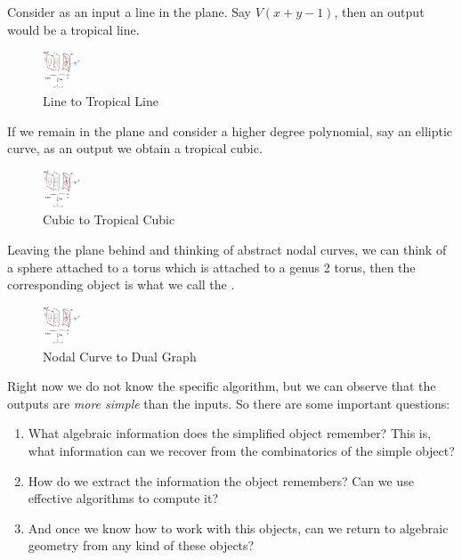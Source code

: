 \documentclass[12pt]{memoir}
\begin{document}
\begin{Ex}
    Consider as an input a line in the plane. Say $V(x+y-1)$, then an output would be a tropical line. 
    \begin{figure}[h!]
        \centering
        \includegraphics[width=0.1\textwidth]{figs/fig1-1.png}%
        \caption{Line to Tropical Line}
        \label{fig:1-1-LineToTropLine}
    \end{figure}
    If we remain in the plane and consider a higher degree polynomial, say an elliptic curve, as an output we obtain a tropical cubic.
    \begin{figure}[h!]
        \centering
        \includegraphics[width=0.1\textwidth]{figs/fig1-1.png}%
        \caption{Cubic to Tropical Cubic}
        \label{fig:1-2-CubicToTropCubic}
    \end{figure}
    Leaving the plane behind and thinking of abstract nodal curves, we can think of a sphere attached to a torus which is attached to a genus 2 torus, then the corresponding object is what we call the .
    \begin{figure}[h!]
        \centering
        \includegraphics[width=0.1\textwidth]{figs/fig1-1.png}%
        \caption{Nodal Curve to Dual Graph}
        \label{fig:1-3-NodalToGraph}
    \end{figure}
\end{Ex}

Right now we do not know the specific algorithm, but we can observe that the outputs are \emph{more simple} than the inputs. So there are some important questions:

\begin{enumerate}
    \item What algebraic information does the simplified object remember? This is, what information can we recover from the combinatorics of the simple object?
    \item How do we extract the information the object remembers? Can we use effective algorithms to compute it?
    \item And once we know how to work with this objects, can we return to algebraic geometry from any kind of these objects?
\end{enumerate}
\end{document}
